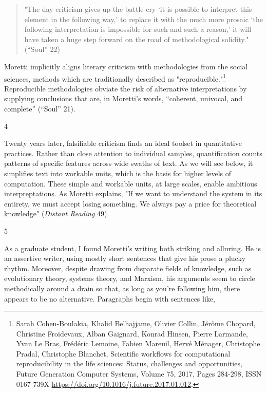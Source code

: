 \documentclass[11pt]{article}
\begin{document}
\begin{quote}
"The day criticism gives up the battle cry ‘it is possible to
interpret this element in the following way,’ to replace it with the
much more prosaic ‘the following interpretation is impossible for such
and such a reason,’ it will have taken a huge step forward on the road
of methodological solidity." (“Soul” 22)
\end{quote}
Moretti implicitly aligns literary criticism with methodologies from
the social sciences, methods which are traditionally described as
"reproducible."\footnote{Sarah Cohen-Boulakia, Khalid Belhajjame, Olivier Collin, Jérôme
Chopard, Christine Froidevaux, Alban Gaignard, Konrad Hinsen, Pierre
Larmande, Yvan Le Bras, Frédéric Lemoine, Fabien Mareuil, Hervé
Ménager, Christophe Pradal, Christophe Blanchet, Scientific workflows
for computational reproducibility in the life sciences: Status,
challenges and opportunities, Future Generation Computer Systems,
Volume 75, 2017, Pages 284-298, ISSN 0167-739X
\url{https://doi.org/10.1016/j.future.2017.01.012}.} Reproducible methodologies obviate the risk of
alternative interpretations by supplying conclusions that are, in
Moretti's words, “coherent, univocal, and complete” (“Soul” 21).

4

Twenty years later, falsifiable criticism finds an ideal toolset in
quantitative practices. Rather than close attention to individual
samples, quantification counts patterns of specific features across
wide swaths of text. As we will see below, it simplifies text into
workable units, which is the basis for higher levels of computation.
These simple and workable units, at large scales, enable ambitious
interpreptations. As Moretti explains, "If we want to understand the
system in its entirety, we must accept losing something. We always pay
a price for theoretical knowledge" (\emph{Distant Reading} 49).

5

As a graduate student, I found Moretti's writing both striking and
alluring. He is an assertive writer, using mostly short sentences that
give his prose a plucky rhythm. Moreover, despite drawing from
disparate fields of knowledge, such as evolutionary theory, systems
theory, and Marxism, his arguments seem to circle methodically around
a drain so that, as long as you're following him, there appears to be
no alternative. Paragraphs begin with sentences like,
\end{document}
